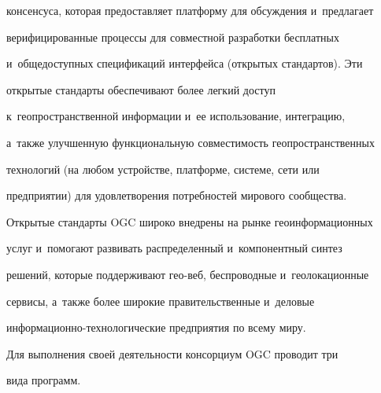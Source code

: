 консенсуса, которая предостав\-ля\-ет платформу для обсуж\-де\-ния и~предлагает 


верифицированные процессы для совместной разработки бес\-плат\-ных 


и~общедоступных спецификаций интерфейса (открытых стандартов). Эти 


открытые стандарты обеспечивают более легкий до\-ступ 


к~геопространственной информации и~ее использование, интеграцию, 


а~так\-же улучшенную функциональную совместимость геопространственных 


технологий (на любом устройстве, платформе, сис\-те\-ме, сети или 


предприятии) для удовлетворения по\-треб\-но\-стей мирового сообщества. 


Открытые стандарты OGC широко внед\-ре\-ны на рынке геоинформационных 


услуг и~помогают развивать распределенный и~компонентный синтез 


решений, которые поддерживают гео-веб, беспроводные и~геолокационные 


сервисы, а~также более широкие правительственные и~деловые 


 информационно-тех\-но\-ло\-ги\-че\-ские пред\-при\-ятия по всему миру.


  


     Для выполнения своей деятельности консорциум OGC проводит три 


вида программ.


